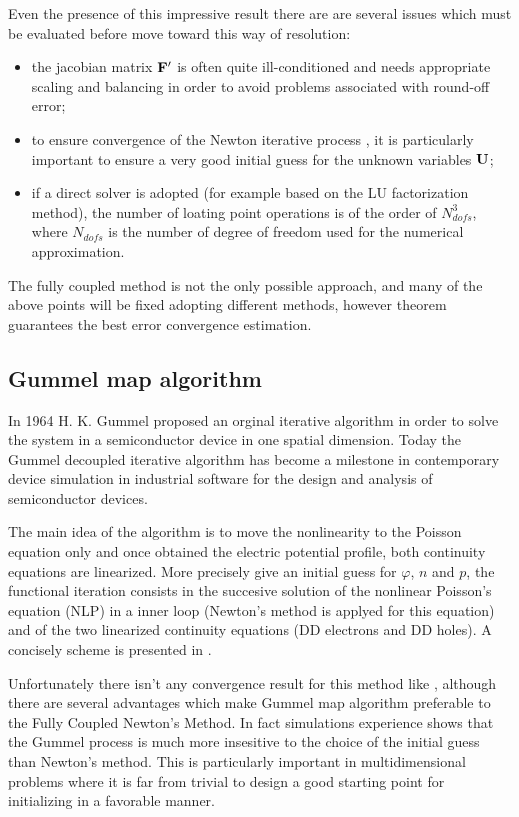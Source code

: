 Even the presence of this impressive result there are are several issues which must be evaluated before move toward this way of resolution:
\begin{itemize}
\item the jacobian matrix $\mathbf{F'}$ is often quite ill-conditioned and needs appropriate scaling and balancing in order to avoid problems associated with round-off error;
\item to ensure convergence of the Newton iterative process , it is particularly important to ensure a very good initial guess for the unknown variables $\mathbf{U}$;
\item if a direct solver is adopted (for example based on the LU factorization method), the number of loating point operations is of the order of  $N_{dofs}^3$, where $N_{dofs}$ is the number of degree of freedom used for the numerical approximation.
\end{itemize}

The fully coupled method is not the only possible approach, and many of the above points will be fixed adopting different methods, however theorem  guarantees the best error convergence estimation.

\subsection{Gummel map algorithm}

In 1964 H. K. Gummel proposed an orginal iterative algorithm in order to solve the system  in a semiconductor device in one spatial dimension. Today the Gummel decoupled iterative algorithm has become a milestone in contemporary device simulation in industrial software for the design and analysis of semiconductor devices.

The main idea of the algorithm is to move the nonlinearity to the Poisson equation only and once obtained the electric potential profile, both continuity equations are linearized.  More precisely give an initial guess for $\varphi$, $n$ and $p$, the functional iteration consists in the succesive solution of the nonlinear Poisson's equation (NLP) in a inner loop (Newton's method is applyed for this equation) and of the two linearized continuity equations (DD electrons and DD holes). 
A concisely scheme is presented in .

Unfortunately there isn't any convergence result for this method like , although there are several advantages which make Gummel map algorithm preferable to the Fully Coupled Newton's Method.
In fact simulations experience shows that the Gummel process is much more insesitive to the choice of the initial guess than Newton's method. This is particularly important in multidimensional problems where it is far from trivial to design a good starting point for initializing in a favorable manner.

